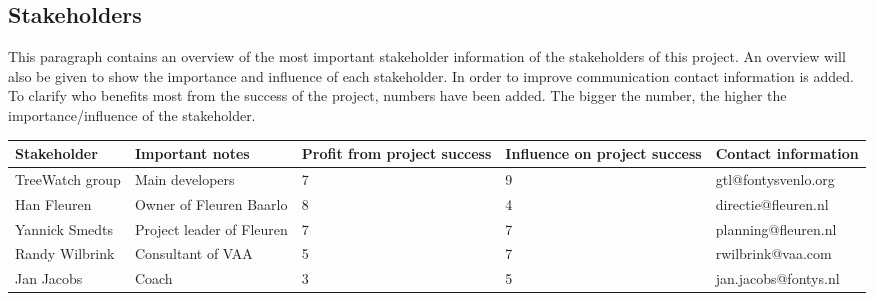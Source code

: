 \subsection{Stakeholders}
This paragraph contains an overview of the most important stakeholder information of the stakeholders of this project. An overview will also be given to show the importance and influence of each stakeholder. In order to improve communication contact information is added. To clarify who benefits most from the success of the project, numbers have been added. The bigger the number, the higher the importance/influence of the stakeholder.\\

\begin{longtable}[htbp]{ p{}  p{2.5cm}  p{}  p{}  p{} }
	\textbf{Stakeholder} & \textbf{Important notes} & \textbf{Profit from project success} & \textbf{Influence on project success} & \textbf{Contact information} \\
	\hline
	\endhead
	TreeWatch group & Main developers & 7 & 9 & gtl@fontysvenlo.org \\
	Han Fleuren & Owner of Fleuren Baarlo & 8 & 4 & directie@fleuren.nl \\
	Yannick Smedts & Project leader of Fleuren & 7 & 7 & planning@fleuren.nl \\
	Randy Wilbrink & Consultant of VAA & 5 & 7 & rwilbrink@vaa.com \\
	Jan Jacobs & Coach & 3 & 5 & jan.jacobs@fontys.nl
\end{longtable}
